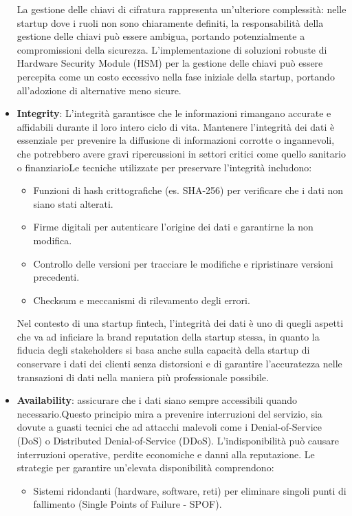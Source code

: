 \documentclass[a4paper,12pt]{report}
\begin{document}
\begin{itemize}
    La gestione delle chiavi di cifratura rappresenta un'ulteriore complessità: nelle startup dove i ruoli non sono chiaramente definiti, la responsabilità della gestione delle chiavi può essere ambigua, portando potenzialmente a compromissioni della sicurezza. L'implementazione di soluzioni robuste di Hardware Security Module (HSM) per la gestione delle chiavi può essere percepita come un costo eccessivo nella fase iniziale della startup, portando all'adozione di alternative meno sicure.
    \item \textbf{Integrity}: L'integrità garantisce che le informazioni rimangano accurate e affidabili durante il loro intero ciclo di vita. Mantenere l'integrità dei dati è essenziale per prevenire la diffusione di informazioni corrotte o ingannevoli, che potrebbero avere gravi ripercussioni in settori critici come quello sanitario o finanziario\cite{ciaPaper}Le tecniche utilizzate per preservare l'integrità includono:
    \begin{itemize}
        \item Funzioni di hash crittografiche (es. SHA-256) per verificare che i dati non siano stati alterati.
        \item Firme digitali per autenticare l'origine dei dati e garantirne la non modifica.
        \item Controllo delle versioni per tracciare le modifiche e ripristinare versioni precedenti.
        \item Checksum e meccanismi di rilevamento degli errori.
    \end{itemize}
    Nel contesto di una startup fintech, l'integrità dei dati è uno di quegli aspetti che va ad inficiare la brand reputation della startup stessa, in quanto la fiducia degli stakeholders si basa anche sulla capacità della startup di conservare i dati dei clienti senza distorsioni e di garantire l'accuratezza nelle transazioni di dati nella maniera più professionale possibile.
    \item \textbf{Availability}: assicurare che i dati siano sempre accessibili quando necessario.\cite{ciaPaper}Questo principio mira a prevenire interruzioni del servizio, sia dovute a guasti tecnici che ad attacchi malevoli come i Denial-of-Service (DoS) o Distributed Denial-of-Service (DDoS). L'indisponibilità può causare interruzioni operative, perdite economiche e danni alla reputazione. Le strategie per garantire un'elevata disponibilità comprendono:
    \begin{itemize}
        \item Sistemi ridondanti (hardware, software, reti) per eliminare singoli punti di fallimento (Single Points of Failure - SPOF).

\end{itemize}
\end{itemize}
\end{document}
